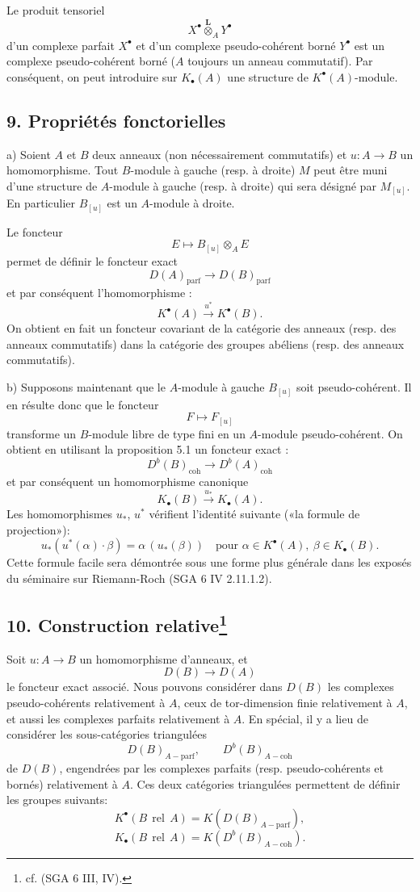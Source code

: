\documentclass[11pt]{article}
\providecommand{\parf}{\mathrm{parf}}
\providecommand{\coh}{\mathrm{coh}}
\providecommand{\parf}{\mathrm{parf}}
\providecommand{\coh}{\mathrm{coh}}
\begin{document}
Le produit tensoriel
\[
X^\bullet\overset{\mathbf L}{\otimes}_A Y^\bullet
\]
d'un complexe parfait $X^\bullet$ et d'un complexe pseudo-cohérent borné $Y^\bullet$ est un complexe pseudo-cohérent borné ($A$ toujours un anneau commutatif). Par conséquent, on peut introduire sur $K_\bullet(A)$ une structure de $K^{\bullet}(A)$-module.

\subsection*{9. Propriétés fonctorielles}

a) Soient $A$ et $B$ deux anneaux (non nécessairement commutatifs) et $u:A\to B$ un homomorphisme. Tout $B$-module à gauche (resp. à droite) $M$ peut être muni d'une structure de $A$-module à gauche (resp. à droite) qui sera désigné par $M_{[u]}$. En particulier $B_{[u]}$ est un $A$-module à droite.

Le foncteur
\[
E\longmapsto B_{[u]}\otimes_A E
\]
permet de définir le foncteur exact
\[
D(A)_{\parf}\longrightarrow D(B)_{\parf}
\]
et par conséquent l'homomorphisme :
\[
K^{\bullet}(A)\xrightarrow{u^*}K^{\bullet}(B).
\]
On obtient en fait un foncteur covariant de la catégorie des anneaux (resp. des anneaux commutatifs) dans la catégorie des groupes abéliens (resp. des anneaux commutatifs).

b) Supposons maintenant que le $A$-module à gauche $B_{[u]}$ soit pseudo-cohérent. Il en résulte donc que le foncteur
\[
F\longmapsto F_{[u]}
\]
transforme un $B$-module libre de type fini en un $A$-module pseudo-cohérent. On obtient en utilisant la proposition 5.1 un foncteur exact :
\[
D^b(B)_{\coh}\longrightarrow D^b(A)_{\coh}
\]
et par conséquent un homomorphisme canonique
\[
K_\bullet(B)\xrightarrow{u_*}K_\bullet(A).
\]
Les homomorphismes $u_*$, $u^*$ vérifient l'identité suivante («la formule de projection»):
\[
u_*(u^*(\alpha)\cdot \beta)=\alpha\,(u_*(\beta))
\quad\text{pour }\alpha\in K^{\bullet}(A),\ \beta\in K_\bullet(B).
\]
Cette formule facile sera démontrée sous une forme plus générale dans les exposés du séminaire sur Riemann-Roch (SGA 6 IV 2.11.1.2).

\subsection*{10. Construction relative\footnote{cf. (SGA 6 III, IV).}}

Soit $u:A\to B$ un homomorphisme d'anneaux, et
\[
D(B)\longrightarrow D(A)
\]
le foncteur exact associé. Nous pouvons considérer dans $D(B)$ les complexes pseudo-cohérents relativement à $A$, ceux de tor-dimension finie relativement à $A$, et aussi les complexes parfaits relativement à $A$. En spécial, il y a lieu de considérer les sous-catégories triangulées
\[
D(B)_{A-\parf},\qquad D^b(B)_{A-\coh}
\]
de $D(B)$, engendrées par les complexes parfaits (resp. pseudo-cohérents et bornés) relativement à $A$. Ces deux catégories triangulées permettent de définir les groupes suivants:
\[
K^{\bullet}(B\operatorname{\,rel\,}A)=K(D(B)_{A-\parf}),
\]
\[
K_\bullet(B\operatorname{\,rel\,}A)=K(D^b(B)_{A-\coh}).
\]
\end{document}

